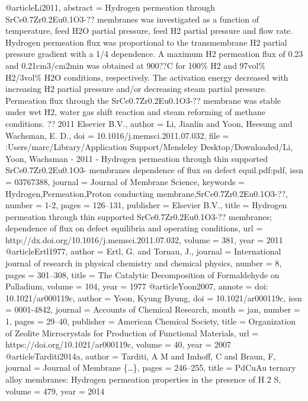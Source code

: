 @article{Li2011,
abstract = {Hydrogen permeation through SrCe0.7Zr0.2Eu0.1O3-?? membranes was investigated as a function of temperature, feed H2O partial pressure, feed H2 partial pressure and flow rate. Hydrogen permeation flux was proportional to the transmembrane H2 partial pressure gradient with a 1/4 dependence. A maximum H2 permeation flux of 0.23 and 0.21cm3/cm2min was obtained at 900??C for 100{\%} H2 and 97vol{\%} H2/3vol{\%} H2O conditions, respectively. The activation energy decreased with increasing H2 partial pressure and/or decreasing steam partial pressure. Permeation flux through the SrCe0.7Zr0.2Eu0.1O3-?? membrane was stable under wet H2, water gas shift reaction and steam reforming of methane conditions. ?? 2011 Elsevier B.V.},
author = {Li, Jianlin and Yoon, Heesung and Wachsman, E. D.},
doi = {10.1016/j.memsci.2011.07.032},
file = {:Users/marc/Library/Application Support/Mendeley Desktop/Downloaded/Li, Yoon, Wachsman - 2011 - Hydrogen permeation through thin supported SrCe0.7Zr0.2Eu0.1O3- membranes dependence of flux on defect equil.pdf:pdf},
issn = {03767388},
journal = {Journal of Membrane Science},
keywords = {Hydrogen,Permeation,Proton conducting membrane,SrCe0.7Zr0.2Eu0.1O3-??},
number = {1-2},
pages = {126--131},
publisher = {Elsevier B.V.},
title = {{Hydrogen permeation through thin supported SrCe0.7Zr0.2Eu0.1O3-?? membranes; dependence of flux on defect equilibria and operating conditions}},
url = {http://dx.doi.org/10.1016/j.memsci.2011.07.032},
volume = {381},
year = {2011}
}
@article{Ertl1977,
author = {Ertl, G. and Tornau, J.},
journal = {International journal of research in physical chemistry and chemical physics},
number = {8},
pages = {301--308},
title = {{The Catalytic Decomposition of Formaldehyde on Palladium}},
volume = {104},
year = {1977}
}
@article{Yoon2007,
annote = {doi: 10.1021/ar000119c},
author = {Yoon, Kyung Byung},
doi = {10.1021/ar000119c},
issn = {0001-4842},
journal = {Accounts of Chemical Research},
month = {jan},
number = {1},
pages = {29--40},
publisher = {American Chemical Society},
title = {{Organization of Zeolite Microcrystals for Production of Functional Materials}},
url = {https://doi.org/10.1021/ar000119c},
volume = {40},
year = {2007}
}
@article{Tarditi2014a,
author = {Tarditi, A M and Imhoff, C and Braun, F},
journal = {Journal of Membrane {\{}{\ldots}{\}}},
pages = {246--255},
title = {{PdCuAu ternary alloy membranes: Hydrogen permeation properties in the presence of H 2 S}},
volume = {479},
year = {2014}
}
